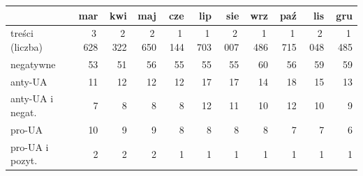 \begin{tabular}{@{}lrrrrrrrrrr@{}}
\toprule
 & mar & kwi & maj & cze & lip & sie & wrz & paź & lis & gru \\
\midrule
treści (liczba) & 3\,628 & 2\,322 & 2\,650 & 1\,144 & 1\,703 & 2\,007 & 1\,486 & 1\,715 & 2\,048 & 1\,485 \\
negatywne & 53 & 51 & 56 & 55 & 55 & 55 & 60 & 56 & 59 & 59 \\
anty-UA & 11 & 12 & 12 & 12 & 17 & 17 & 14 & 18 & 15 & 13 \\
anty-UA i negat. & 7 & 8 & 8 & 8 & 12 & 11 & 10 & 12 & 10 & 9 \\
pro-UA & 10 & 9 & 9 & 8 & 8 & 8 & 8 & 7 & 7 & 6 \\
pro-UA i pozyt. & 2 & 2 & 2 & 1 & 1 & 1 & 1 & 1 & 1 & 1 \\
\bottomrule
\end{tabular}
